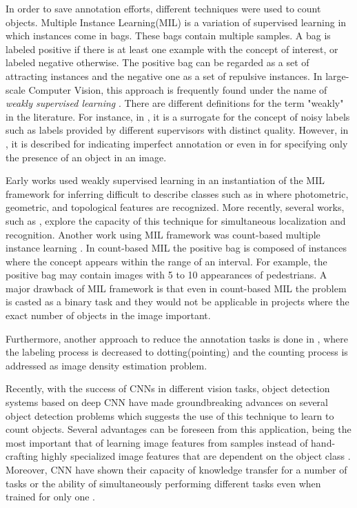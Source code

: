 In order to save annotation efforts, different techniques were used to count objects. Multiple Instance Learning(MIL) \cite{foulds2010review} is a variation of supervised learning in which instances come in bags. These bags contain multiple samples. A bag is labeled positive if there is at least one example with the concept of interest, or labeled negative otherwise. The positive bag can be regarded as a set of attracting instances and the negative one as a set of repulsive instances. In large-scale Computer Vision, this approach is frequently found under the name of \textit{weakly supervised learning} \cite{weber2000unsupervised, fergus2003object}. There are different definitions for the term "weakly" in the literature. For instance, in \cite{dekel2009good}, it is a surrogate for the concept of noisy labels such as labels provided by different supervisors with distinct quality. However, in \cite{raykar2009supervised}, it is described for indicating imperfect annotation or even in \cite{wang2013weakly} for specifying only the presence of an object in an image. 

\indent Early works used weakly supervised learning in an instantiation of the MIL framework for inferring difficult to describe classes such as in \cite{todorovic2006extracting} where photometric, geometric, and topological features are recognized. More recently, several works, such as \cite{nguyen2009weakly}, explore the capacity of this technique for simultaneous localization and recognition. Another work using MIL framework was count-based multiple instance learning \cite{foulds2010review}. In count-based MIL the positive bag is composed of instances where the concept appears within the range of an interval. For example, the positive bag may contain images with 5 to 10 appearances of pedestrians. A major drawback of MIL framework is that even in count-based MIL the problem is casted as a binary task and they would not be applicable in projects where the exact number of objects in the image important. 

Furthermore, another approach to reduce the annotation tasks is done in \cite{flaccavento2011learning}, where the labeling process is decreased to dotting(pointing) and the counting process is addressed as image density estimation problem.  

Recently, with the success of CNNs in different vision tasks, object detection systems based on deep CNN have made groundbreaking advances on several object detection problems \cite{zhang2015improving, erhan2014scalable, girshick2014rich, he2015spatial, erhan2014scalable} which suggests the use of this technique to learn to count objects. Several advantages can be foreseen from this application, being the most important that of learning image features from samples instead of hand-crafting highly specialized image features that are dependent on the object class \cite{segui2015learning}. Moreover, CNN have shown their capacity of knowledge transfer for a number of tasks or the ability of simultaneously performing different tasks even when trained for only one \cite{zhou2014learning}. 

